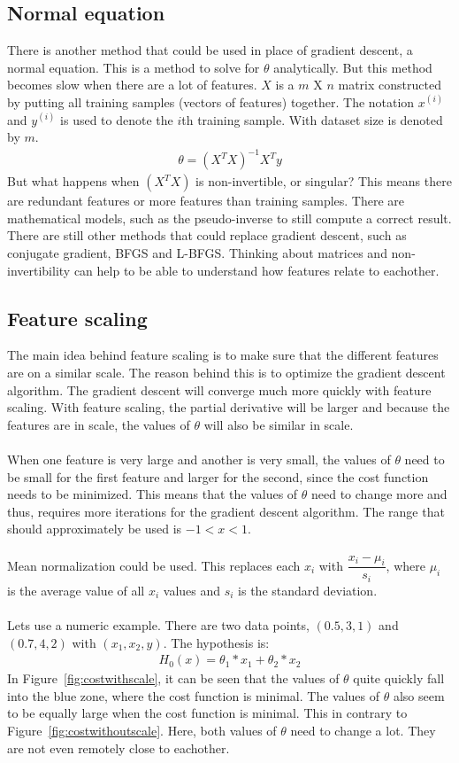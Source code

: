 \subsection{Normal equation}
There is another method that could be used in place of gradient descent, a normal equation. This is a method to solve for $\theta$ analytically. But this method becomes slow when there are a lot of features. $X$ is a $m$ X $n$ matrix constructed by putting all training samples (vectors of features) together. The notation $x^{(i)}$ and $y^{(i)}$ is used to denote the $i$th training sample. With dataset size is denoted by $m$.
 \begin{gather}
  \theta =  (X^TX)^{-1}X^Ty
  \end{gather}
But what happens when $(X^TX)$ is non-invertible, or singular? This means there are redundant features or more features than training samples. There are mathematical models, such as the pseudo-inverse to still compute a correct result. There are still other methods that could replace gradient descent, such as conjugate gradient, BFGS and L-BFGS. Thinking about matrices and non-invertibility can help to be able to understand how features relate to eachother.

\subsection{Feature scaling}
The main idea behind feature scaling is to make sure that the different features are on a similar scale. The reason behind this is to optimize the gradient descent algorithm. The gradient descent will converge much more quickly with feature scaling. With feature scaling, the partial derivative will be larger and because the features are in scale, the values of $\theta$ will also be similar in scale.\\
\\
When one feature is very large and another is very small, the values of $\theta$ need to be small for the first feature and larger for the second, since the cost function needs to be minimized. This means that the values of $\theta$ need to change more and thus, requires more iterations for the gradient descent algorithm. The range that should approximately be used is $-1 < x < 1$. \\
\\
Mean normalization could be used. This replaces each $x_i$ with $\dfrac{x_i - \mu_i}{s_i}$, where $\mu_i$ is the average value of all $x_i$ values and $s_i$ is the standard deviation.\\
\\
Lets use a numeric example. There are two data points, $(0.5, 3, 1)$ and $(0.7, 4, 2)$ with $(x_1, x_2, y)$. The hypothesis is:
\begin{align}
H_0(x) = \theta_1 * x_1 + \theta_2 * x_2
\end{align}
\noindent In Figure~\ref{fig:costwithscale}, it can be seen that the values of $\theta$ quite quickly fall into the blue zone, where the cost function is minimal. The values of $\theta$ also seem to be equally large when the cost function is minimal. This in contrary to Figure~\ref{fig:costwithoutscale}. Here, both values of $\theta$ need to change a lot. They are not even remotely close to eachother. 

